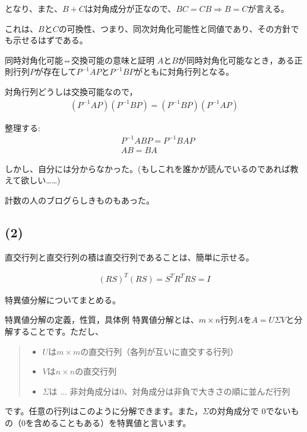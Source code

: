 \documentclass[a4paper, 10pt, dvipdfmx]{jlreq}
\begin{document}
となり、また、$B+C$は対角成分が正なので、$BC=CB \Rightarrow B=C$が言える。

これは、$B$と$C$の可換性、つまり、同次対角化可能性と同値であり、その方針でも示せるはずである。

\begin{itembox}[l]{同時対角化可能⇔交換可能の意味と証明\cite{site:1}}
  $A$と$B$が同時対角化可能なとき，ある正則行列$P$が存在して$P^{-1}AP$と$P^{-1}BP$がともに対角行列となる。

  対角行列どうしは交換可能なので，
  \begin{align*}
    (P^{-1}AP)(P^{-1}BP)=(P^{-1}BP)(P^{-1}AP)
  \end{align*}

  整理する:
  \begin{align*}
     & P^{-1}ABP=P^{-1}BAP \\
     & AB=BA
  \end{align*}
\end{itembox}

しかし、自分には分からなかった。(もしこれを誰かが読んでいるのであれば教えて欲しい……)

計数の人のブログらしきものもあった。\cite{site:2}

\subsection*{(2)}

直交行列と直交行列の積は直交行列であることは、簡単に示せる。

\begin{align*}
  (RS)^T(RS)=S^TR^TRS=I
\end{align*}

特異値分解についてまとめる。

\begin{itembox}[l]{特異値分解の定義，性質，具体例\cite{site:3}}
  特異値分解とは、$m\times n$行列$A$を$A=U \Sigma V$と分解することです。ただし、

  \begin{quote}
    \begin{itemize}
      \item $U$は$m \times m$の直交行列（各列が互いに直交する行列）
      \item $V$は$n \times n$の直交行列
      \item $\Sigma$は ... 非対角成分は0、対角成分は非負で大きさの順に並んだ行列
    \end{itemize}
  \end{quote}

  です。任意の行列はこのように分解できます。また，$Σ$の対角成分で 0でないもの（0を含めることもある）を特異値と言います。
\end{itembox}
\end{document}
